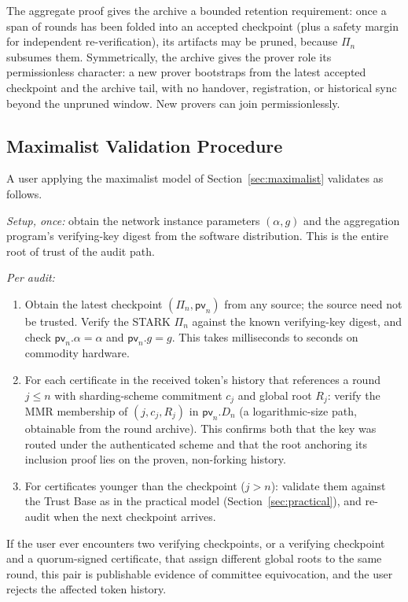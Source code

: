 \documentclass[twocolumn]{article}
\begin{document}
The aggregate proof gives the archive a bounded retention requirement: once a span of rounds has been folded into an accepted checkpoint (plus a safety margin for independent re-verification), its artifacts may be pruned, because $\Pi_n$ subsumes them. Symmetrically, the archive gives the prover role its permissionless character: a new prover bootstraps from the latest accepted checkpoint and the archive tail, with no handover, registration, or historical sync beyond the unpruned window. New provers can join permissionlessly.

\subsection{Maximalist Validation Procedure}
\label{sec:maxi-validation}

A user applying the maximalist model of Section~\ref{sec:maximalist} validates as follows.

\emph{Setup, once:} obtain the network instance parameters $(\alpha, g)$ and the aggregation program's verifying-key digest from the software distribution. This is the entire root of trust of the audit path.

\emph{Per audit:}
\begin{enumerate}[nosep]
  \item Obtain the latest checkpoint $(\Pi_n, \mathsf{pv}_n)$ from any source; the source need not be trusted. Verify the STARK $\Pi_n$ against the known verifying-key digest, and check $\mathsf{pv}_n.\alpha = \alpha$ and $\mathsf{pv}_n.g = g$. This takes milliseconds to seconds on commodity hardware.
  \item For each certificate in the received token's history that references a round $j \leq n$ with sharding-scheme commitment $c_j$ and global root $R_j$: verify the MMR membership of $(j,c_j,R_j)$ in $\mathsf{pv}_n.D_n$ (a logarithmic-size path, obtainable from the round archive). This confirms both that the key was routed under the authenticated scheme and that the root anchoring its inclusion proof lies on the proven, non-forking history.
  \item For certificates younger than the checkpoint ($j > n$): validate them against the Trust Base as in the practical model (Section~\ref{sec:practical}), and re-audit when the next checkpoint arrives.
\end{enumerate}

If the user ever encounters two verifying checkpoints, or a verifying checkpoint and a quorum-signed certificate, that assign different global roots to the same round, this pair is publishable evidence of committee equivocation, and the user rejects the affected token history.
\end{document}
